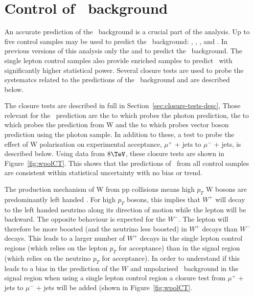 \clearpage
\section{Control of \zInv\ background \label{app:zInvBgControl}}


An accurate prediction of the \zInv\ background is a crucial part 
of the analysis. Up to five control samples may be used 
to predict the \zInv\ background: \mj, \mmj, \ej, \eej and \gj. 
In previous versions of this analysis only the \zmmj and 
\gj to predict the \zInv\ background. The single
lepton control samples also provide \wj enriched samples to predict
\zInv\ with significantly higher statistical power. 
Several closure tests are used to probe the 
systematcs related to the predictions of the \zInv\ background
and are described below.

The closure tests are described in full in Section~\ref{sec:closure-tests-desc},
Those relevant for the \zInv\ prediction are the \mmj to \gj
which probes the photon prediction, the \mj to \mmj which probes the
prediction from W and the \mj to \gj which probes vector boson prediction 
using the photon sample. In addition to these, a test to probe the effect
of W polarisation on experimental acceptance, $\mu^+$ + jets to $\mu^-$ + jets,
is described below. Using data from $8\TeV$, 
these closure tests are shown in Figure~\ref{fig:wpolCT}.
This shows that the predictions of \zInv\ from
all control samples are consistent within statistical 
uncertainty with no bias or trend. 


The production mechanism of W from pp collisions means
high $p_T$ W bosons are predominantly left handed \cite{WPol}.  
For high $p_T$ bosons, this implies that $W^+$ will decay 
to the left handed neutrino along its direction of motion while 
the lepton will be backward. The opposite behaviour is
expected for the $W^-$. The lepton will therefore be more boosted (and
the neutrino less boosted) in $W^+$ decays than $W^-$ decays.  This
leads to a larger number of $W^+$ decays in the single lepton control
regions (which relies on the lepton $p_T$ for acceptance) than in the
signal region (which relies on the neutrino $p_T$ for acceptance). In
order to understand if this leads to a bias in the prediction of the
$W$ and unpolarised \zInv\ background in the signal region when using
a single lepton control region a closure test from $\mu^+$ + jets to
$\mu^-$ + jets will be added (shown in Figure~\ref{fig:wpolCT}. 

